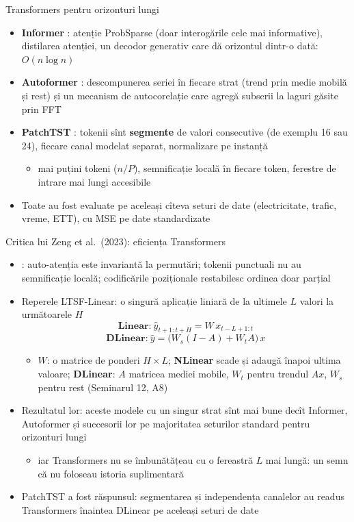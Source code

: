 \begin{frame}{Transformers pentru orizonturi lungi}
\itemsize{\small}
\begin{itemize}
    \item \textbf{Informer} : atenție ProbSparse (doar interogările cele mai informative), distilarea atenției, un decodor generativ care dă orizontul dintr-o dată: $O(n\log n)$
    \item \textbf{Autoformer} : descompunerea seriei în fiecare strat (trend prin medie mobilă și rest) și un mecanism de autocorelație care agregă subserii la laguri găsite prin FFT
    \item \textbf{PatchTST} : tokenii sînt \textbf{segmente} de valori consecutive (de exemplu 16 sau 24), fiecare canal modelat separat, normalizare pe instanță
    \begin{itemize}
        \item mai puțini tokeni ($n/P$), semnificație locală în fiecare token, ferestre de intrare mai lungi accesibile
    \end{itemize}
    \item Toate au fost evaluate pe aceleași cîteva seturi de date (electricitate, trafic, vreme, ETT), cu MSE pe date standardizate
\end{itemize}
\end{frame}

\begin{frame}{Critica lui Zeng et al.\ (2023): eficiența Transformers}
\itemsize{\small}
\begin{itemize}
    \item {}: auto-atenția este invariantă la permutări; tokenii punctuali nu au semnificație locală; codificările poziționale restabilesc ordinea doar parțial
    \item Reperele LTSF-Linear: o singură aplicație liniară de la ultimele $L$ valori la următoarele $H$
    \[ \textbf{Linear:}\ \hat y_{t+1:t+H} = W\,x_{t-L+1:t} \]
    \[ \textbf{DLinear:}\ \hat y = \big(W_s(I - A) + W_tA\big)\,x \]
    \begin{itemize}
        \item $W$: o matrice de ponderi $H \times L$; \textbf{NLinear} scade și adaugă înapoi ultima valoare; \textbf{DLinear}: $A$ matricea mediei mobile, $W_t$ pentru trendul $Ax$, $W_s$ pentru rest (Seminarul 12, A8)
    \end{itemize}
    \item Rezultatul lor: aceste modele cu un singur strat sînt mai bune decît Informer, Autoformer și succesorii lor pe majoritatea seturilor standard pentru orizonturi lungi
    \begin{itemize}
        \item iar Transformers nu se îmbunătățeau cu o fereastră $L$ mai lungă: un semn că nu foloseau istoria suplimentară
    \end{itemize}
    \item PatchTST a fost răspunsul: segmentarea și independența canalelor au readus Transformers înaintea DLinear pe aceleași seturi de date
\end{itemize}
\end{frame}

